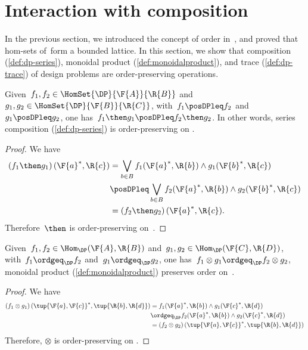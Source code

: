 

\section{Interaction with composition}


In the previous section, we introduced the concept of order in~\DP, and proved that hom-sets of~\DP form a bounded lattice. In this section, we show that composition (\cref{def:dp-series}), monoidal product (\cref{def:monoidalproduct}), and trace (\cref{def:dp-trace}) of design problems are order-preserving operations.
\begin{lemma}
  Given~$f_1,f_2 \in \HomSet{\DP}{\F{A}}{\R{B}}$ and~$g_1,g_2 \in \HomSet{\DP}{\F{B}}{\R{C}}$, with~$f_1\posDPleq f_2$ and~$g_1\posDPleq g_2$, one has~$f_1\then g_1 \posDPleq f_2\then g_2$. In other words, series composition (\cref{def:dp-series}) is order-preserving on \DP.
\end{lemma}

\begin{proof}
  We have
  \begin{equation}
    \begin{aligned}
      \left( f_1\then g_1\right)(\F{a}^*,\R{c})&=\bigvee_{b\in B}f_1(\F{a}^*,\R{b})\wedge g_1(\F{b}^*,\R{c})\\
      &\posDPleq \bigvee_{b\in B} f_2(\F{a}^*,\R{b})\wedge g_2(\F{b}^*,\R{c})\\
      &=\left( f_2\then g_2\right)(\F{a}^*,\R{c}).
    \end{aligned}
  \end{equation}
  Therefore~$\then$ is order-preserving on~\DP.
\end{proof}

\begin{lemma}
  Given~$f_1,f_2 \in \Hom_\DP(\F{A},\R{B})$ and~$g_1,g_2 \in \Hom_\DP(\F{C},\R{D})$, with~$f_1\ordgeq_\DP f_2$ and~$g_1\ordgeq_\DP g_2$, one has~$f_1\otimes g_1 \ordgeq_\DP f_2\otimes g_2$, \ie  monoidal product (\cref{def:monoidalproduct}) preserves order on~\DP.
\end{lemma}

\begin{proof}
  We have
  \begin{equation}
    \begin{aligned}
      \left( f_1\otimes g_1\right) (\tup{\F{a},\F{c}}^*,\tup{\R{b},\R{d}})&=f_1(\F{a}^*,\R{b})\wedge g_1(\F{c}^*,\R{d})\\
      &\ordgeq_\DP f_2(\F{a}^*,\R{b})\wedge g_2(\F{c}^*,\R{d})\\
      &=\left( f_2\otimes g_2\right) (\tup{\F{a},\F{c}}^*,\tup{\R{b},\R{d}})
    \end{aligned}
  \end{equation}
  Therefore, $\otimes$ is order-preserving on \DP.
\end{proof}

